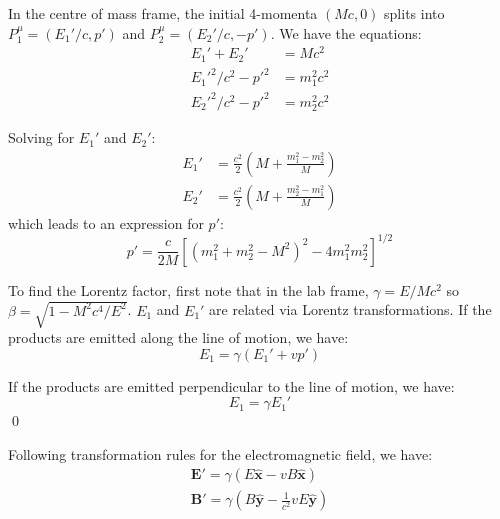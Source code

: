\documentclass[12pt]{article}
\begin{document}
In the centre of mass frame, the initial 4-momenta $(Mc, 0)$ splits into $P_{1}^{\mu} = (E_{1}'/c, p')$ and $P_{2}^{\mu} = (E_{2}'/c, -p')$. We have the equations:
\begin{equation}
    \begin{split}
        E_{1}' + E_{2}' &= M c^{2} \\
        E_{1}'^{2}/c^{2} - p'^{2} &= m_{1}^{2}c^{2} \\
        E_{2}'^{2}/c^{2} - p'^{2} &= m_{2}^{2}c^{2}
    \end{split}
\end{equation}

Solving for $E_{1}'$ and $E_{2}'$:
\begin{equation}
    \begin{split}
        E_{1}' &= \frac{c^{2}}{2} \left( M + \frac{m_{1}^{2} - m_{2}^{2}}{M} \right) \\
        E_{2}' &= \frac{c^{2}}{2} \left( M + \frac{m_{2}^{2} - m_{1}^{2}}{M} \right)
    \end{split}
\end{equation}
which leads to an expression for $p'$:
\begin{equation}
    p' = \frac{c}{2M} \left[ (m_{1}^{2} + m_{2}^{2} - M^{2})^{2} - 4m_{1}^{2}m_{2}^{2} \right]^{1/2}
\end{equation}

To find the Lorentz factor, first note that in the lab frame, $\gamma = E/Mc^{2}$ so $\beta = \sqrt{1 - M^{2}c^{4}/E^{2}}$. $E_{1}$ and $E_{1}'$ are related via Lorentz transformations. If the products are emitted along the line of motion, we have:
\begin{equation}
    E_{1} = \gamma (E_{1}' + v p')
\end{equation}

If the products are emitted perpendicular to the line of motion, we have:
\begin{equation}
    E_{1}= \gamma E_{1}'
\end{equation}
\qed



Following transformation rules for the electromagnetic field, we have:
\begin{equation}
    \begin{split}
        \mathbf{E}' = \gamma (E \hat{\mathbf{x}} - vB \hat{\mathbf{x}}) \\
        \mathbf{B}' = \gamma (B \hat{\mathbf{y}} - \frac{1}{c^{2}} vE \hat{\mathbf{y}})
    \end{split}
\end{equation}
\end{document}
